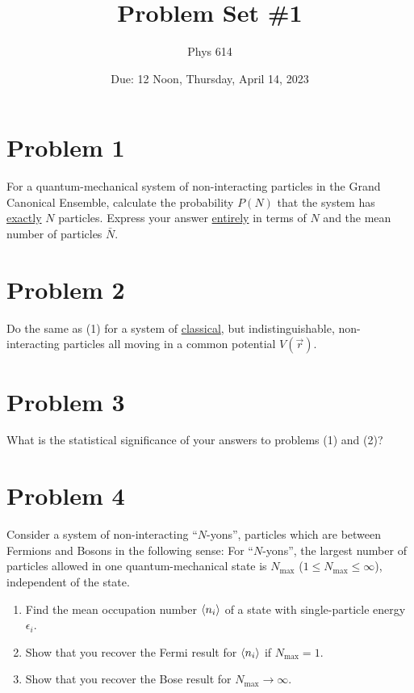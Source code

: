 \documentclass[12pt]{article}
\begin{document}
\title{Problem Set \#1}
\author{Phys 614}
\date{Due: 12 Noon, Thursday, April 14, 2023}
\maketitle

\section*{Problem 1}
For a quantum-mechanical system of non-interacting particles in the Grand Canonical Ensemble, calculate the probability $P(N)$ that the system has \underline{exactly} $N$ particles. Express your answer \underline{entirely} in terms of $N$ and the mean number of particles $\bar{N}$.

\section*{Problem 2}
Do the same as (1) for a system of \underline{classical}, but indistinguishable, non-interacting particles all moving in a common potential $V(\vec{r})$.

\section*{Problem 3}
What is the statistical significance of your answers to problems (1) and (2)?

\section*{Problem 4}
Consider a system of non-interacting ``$N$-yons'', particles which are between Fermions and Bosons in the following sense: For ``$N$-yons'', the largest number of particles allowed in one quantum-mechanical state is $N_{\text{max}}$ ($1 \leq N_{\text{max}} \leq \infty$), independent of the state.
\begin{enumerate}[label=(\alph*)]
    \item Find the mean occupation number $\ev{n_i}$ of a state with single-particle energy $\epsilon_i$.
    \item Show that you recover the Fermi result for $\ev{n_i}$ if $N_{\text{max}}=1$.
    \item Show that you recover the Bose result for $N_{\text{max}}\to\infty$.
\end{enumerate}
\end{document}
